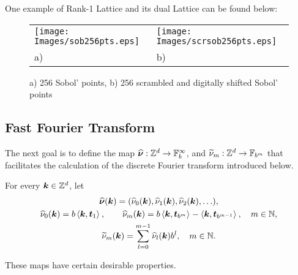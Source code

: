 \documentclass[graybox,footinfo]{svmult}
\newcommand{\Z}{\mathbb{Z}} %
\newcommand{\N}{\mathbb{N}} %
\newcommand{\F}{\mathbb{F}} %
\newcommand{\bst}{\boldsymbol{t}}    %
\begin{document}
One example of Rank-1 Lattice and its dual Lattice can be found below:
\begin{figure}[h!]
\centering
\begin{tabular}{>{\centering}p{5cm}>{\centering}p{5cm}}
\texttt{[image: Images/sob256pts.eps]} &
\texttt{[image: Images/scrsob256pts.eps]}\tabularnewline
a) & b)
\end{tabular}
\caption{a) 256 Sobol' points, b) 256 scrambled and digitally shifted Sobol' points \label{Sobolfig}}
\end{figure}

\subsection{Fast Fourier Transform}
The next goal is to define the map $\hbsnu : \Z^d \to \F_b^{\infty}$, and $\tnu_m : \Z^d \to \F_{b^m}$ that facilitates the calculation of the discrete Fourier transform introduced below.

\begin{definition} \label{numapdef} For every $\bsk \in \Z^d$, let
\begin{subequations} \label{numapdefeq}
\begin{gather}
\hbsnu(\bsk)=(\hnu_0(\bsk), \hnu_1(\bsk), \hnu_2(\bsk), \ldots ), \\
\hnu_0(\bsk) = b\ip{\bsk}{\bst_{1}}, \qquad \hnu_m(\bsk)=b\ip{\bsk}{\bst_{b^m}}-\ip{\bsk}{\bst_{b^{m-1}}}, \quad m \in \N, \\
\tnu_m(\bsk) = \sum_{l=0}^{m-1} \hnu_{l}(\bsk) b^{l}, \quad m \in \N.
\end{gather}
\end{subequations}
\end{definition}

These maps have certain desirable properties.
\end{document}
